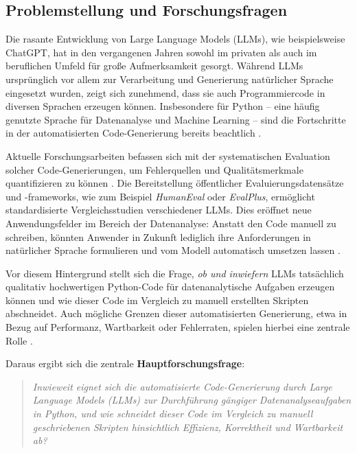 \documentclass[11pt,a4paper]{article}
\begin{document}
\subsection{Problemstellung und Forschungsfragen}

Die rasante Entwicklung von Large Language Models (LLMs), wie beispielsweise ChatGPT, hat in den vergangenen Jahren sowohl im privaten als auch im beruflichen Umfeld für große Aufmerksamkeit gesorgt. Während LLMs ursprünglich vor allem zur Verarbeitung und Generierung natürlicher Sprache eingesetzt wurden, zeigt sich zunehmend, dass sie auch Programmiercode in diversen Sprachen erzeugen können. Insbesondere für Python -- eine häufig genutzte Sprache für Datenanalyse und Machine Learning -- sind die Fortschritte in der automatisierten Code-Generierung bereits beachtlich \cite{web:1,web:2}.

Aktuelle Forschungsarbeiten befassen sich mit der systematischen Evaluation solcher Code-Generierungen, um Fehlerquellen und Qualitätsmerkmale quantifizieren zu können \cite{web:3,web:4}. Die Bereitstellung öffentlicher Evaluierungsdatensätze und -frameworks, wie zum Beispiel \emph{HumanEval} oder \emph{EvalPlus}, ermöglicht standardisierte Vergleichsstudien verschiedener LLMs. Dies eröffnet neue Anwendungsfelder im Bereich der Datenanalyse: Anstatt den Code manuell zu schreiben, könnten Anwender in Zukunft lediglich ihre Anforderungen in natürlicher Sprache formulieren und vom Modell automatisch umsetzen lassen \cite{web:5}.

Vor diesem Hintergrund stellt sich die Frage, \emph{ob und inwiefern} LLMs tatsächlich qualitativ hochwertigen Python-Code für datenanalytische Aufgaben erzeugen können und wie dieser Code im Vergleich zu manuell erstellten Skripten abschneidet. Auch mögliche Grenzen dieser automatisierten Generierung, etwa in Bezug auf Performanz, Wartbarkeit oder Fehlerraten, spielen hierbei eine zentrale Rolle \cite{web:6}.

Daraus ergibt sich die zentrale \textbf{Hauptforschungsfrage}:

\begin{quote}
    \emph{Inwieweit eignet sich die automatisierte Code-Generierung durch Large Language Models (LLMs) 
    zur Durchführung gängiger Datenanalyseaufgaben in Python, und wie schneidet dieser Code 
    im Vergleich zu manuell geschriebenen Skripten hinsichtlich Effizienz, Korrektheit und Wartbarkeit ab?}
\end{quote}
\end{document}
